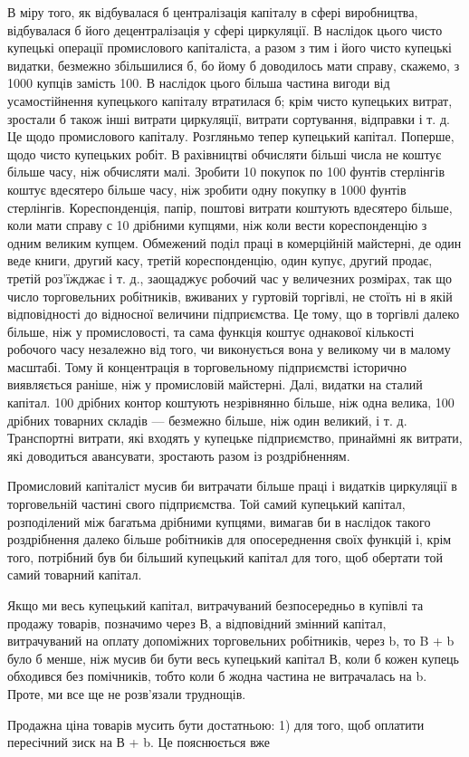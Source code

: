 В міру того, як відбувалася б централізація капіталу в сфері
виробництва, відбувалася б його децентралізація у сфері циркуляції.
В наслідок цього чисто купецькі операції промислового
капіталіста, а разом з тим і його чисто купецькі видатки, безмежно
збільшилися б, бо йому б доводилось мати справу, скажемо,
з 1000 купців замість 100. В наслідок цього більша частина
вигоди від усамостійнення купецького капіталу втратилася б;
крім чисто купецьких витрат, зростали б також інші витрати
циркуляції, витрати сортування, відправки і т. д. Це щодо промислового
капіталу. Розгляньмо тепер купецький капітал. Поперше,
щодо чисто купецьких робіт. В рахівництві обчисляти
більші числа не коштує більше часу, ніж обчисляти малі. Зробити
10 покупок по 100 фунтів стерлінгів коштує вдесятеро більше
часу, ніж зробити одну покупку в 1000 фунтів стерлінгів. Кореспонденція,
папір, поштові витрати коштують вдесятеро більше,
коли мати справу с 10 дрібними купцями, ніж коли вести кореспонденцію
з одним великим купцем. Обмежений поділ праці в комерційній
майстерні, де один веде книги, другий касу, третій
кореспонденцію, один купує, другий продає, третій роз’їжджає
і т. д., заощаджує робочий час у величезних розмірах, так що
число торговельних робітників, вживаних у гуртовій торгівлі,
не стоїть ні в якій відповідності до відносної величини підприємства.
Це тому, що в торгівлі далеко більше, ніж у промисловості,
та сама функція коштує однакової кількості робочого часу
незалежно від того, чи виконується вона у великому чи в малому
масштабі. Тому й концентрація в торговельному підприємстві
історично виявляється раніше, ніж у промисловій майстерні.
Далі, видатки на сталий капітал. 100 дрібних контор коштують
незрівнянно більше, ніж одна велика, 100 дрібних товарних складів
— безмежно більше, ніж один великий, і т. д. Транспортні витрати,
які входять у купецьке підприємство, принаймні як витрати,
які доводиться авансувати, зростають разом із роздрібненням.

Промисловий капіталіст мусив би витрачати більше праці
і видатків циркуляції в торговельній частині свого підприємства.
Той самий купецький капітал, розподілений між багатьма дрібними
купцями, вимагав би в наслідок такого роздрібнення далеко
більше робітників для опосереднення своїх функцій і, крім
того, потрібний був би більший купецький капітал для того,
щоб обертати той самий товарний капітал.

Якщо ми весь купецький капітал, витрачуваний безпосередньо
в купівлі та продажу товарів, позначимо через В, а відповідний
змінний капітал, витрачуваний на оплату допоміжних торговельних
робітників, через b, то B + b було б менше, ніж мусив би
бути весь купецький капітал В, коли б кожен купець обходився
без помічників, тобто коли б жодна частина не витрачалась на b.
Проте, ми все ще не розв’язали труднощів.

Продажна ціна товарів мусить бути достатньою: 1) для того,
щоб оплатити пересічний зиск на В + b. Це пояснюється вже

